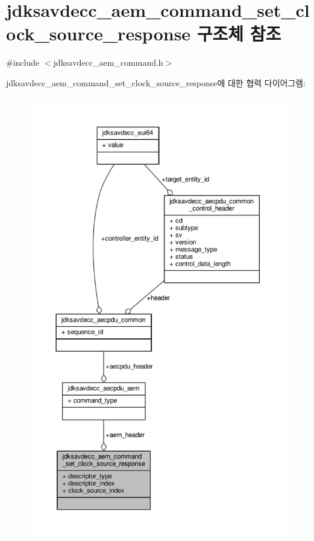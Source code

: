 \hypertarget{structjdksavdecc__aem__command__set__clock__source__response}{}\section{jdksavdecc\+\_\+aem\+\_\+command\+\_\+set\+\_\+clock\+\_\+source\+\_\+response 구조체 참조}
\label{structjdksavdecc__aem__command__set__clock__source__response}


{\ttfamily \#include $<$jdksavdecc\+\_\+aem\+\_\+command.\+h$>$}



jdksavdecc\+\_\+aem\+\_\+command\+\_\+set\+\_\+clock\+\_\+source\+\_\+response에 대한 협력 다이어그램\+:
\nopagebreak
\begin{figure}[H]
\begin{center}
\leavevmode
\includegraphics[height=550pt]{structjdksavdecc__aem__command__set__clock__source__response__coll__graph}
\end{center}
\end{figure}
